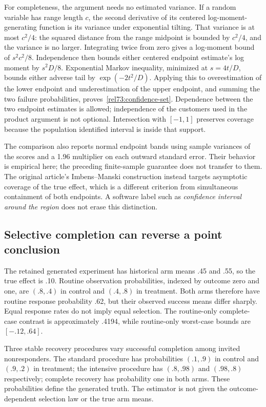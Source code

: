For completeness, the argument needs no estimated variance. If a random
variable has range length $c$, the second derivative of its centered
log-moment-generating function is its variance under exponential tilting.
That variance is at most $c^2/4$: the squared distance from the range
midpoint is bounded by $c^2/4$, and the variance is no larger. Integrating
twice from zero gives a log-moment bound of $s^2c^2/8$. Independence then
bounds either centered endpoint estimate's log moment by $s^2D/8$.
Exponential Markov inequality, minimized at $s=4t/D$, bounds either adverse
tail by $\exp(-2t^2/D)$. Applying this to overestimation of the lower endpoint
and underestimation of the upper endpoint, and summing the two failure
probabilities, proves~\eqref{rel73:confidence-set}. Dependence between the
two endpoint estimates is allowed; independence of the customers used in
the product argument is not optional. Intersection with $[-1,1]$ preserves
coverage because the population identified interval is inside that support.

The comparison also reports normal endpoint bands using sample variances of
the scores and a 1.96 multiplier on each outward standard error. Their
behavior is empirical here; the preceding finite-sample guarantee does not
transfer to them. The original article's Imbens--Manski construction instead
targets asymptotic coverage of the true effect, which is a different
criterion from simultaneous containment of both endpoints. A software label
such as \emph{confidence interval around the region} does not erase this
distinction. \citep{rel73coppock2017,rel73attrition}

\subsection{Selective completion can reverse a point conclusion}

The retained generated experiment has historical arm means .45 and .55,
so the true effect is .10. Routine observation probabilities, indexed by
outcome zero and one, are $(.8,.4)$ in control and $(.4,.8)$ in treatment.
Both arms therefore have routine response probability .62, but their observed
success means differ sharply. Equal response rates do not imply equal
selection. The routine-only complete-case contrast is approximately .4194,
while routine-only worst-case bounds are $[-.12,.64]$.

Three stable recovery procedures vary successful completion among invited
nonresponders. The standard procedure has probabilities $(.1,.9)$ in control
and $(.9,.2)$ in treatment; the intensive procedure has $(.8,.98)$ and
$(.98,.8)$ respectively; complete recovery has probability one in both
arms. These probabilities define the generated truth. The estimator is not
given the outcome-dependent selection law or the true arm means.

